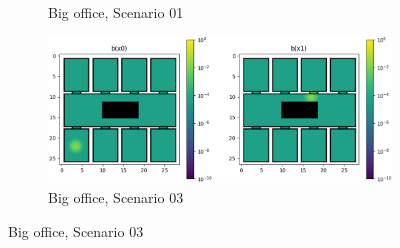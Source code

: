 \begin{figure}
\begin{subfigure}[c]{0.5\textwidth}
        \caption{Big office, Scenario 01}
        \label{subfig:sc01big}
    \end{subfigure}
     \begin{subfigure}[t]{\textwidth}
        \includegraphics[width=\textwidth]{Report/images/scenarios/envbig_sc03_a.png}
        \caption{Big office, Scenario 03}
        \label{subfig:sc03big}
    \end{subfigure}
\end{figure}
